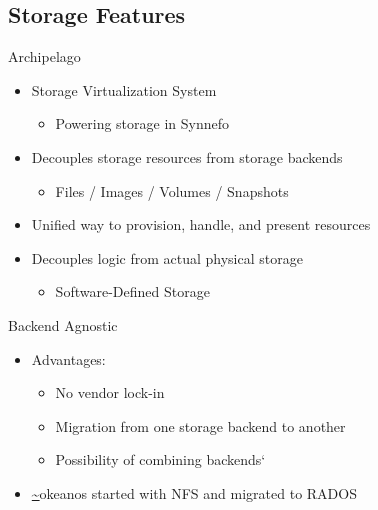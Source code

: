 \documentclass[utf8]{beamer}
\newcommand{\okeanos}{\url{~}okeanos}
\begin{document}
\subsection{Storage Features}

\begin{frame}{Archipelago}

  \begin{itemize}
    \item Storage Virtualization System
      \begin{itemize}
        \item Powering storage in Synnefo
      \end{itemize}
    \item Decouples storage resources from storage backends
      \begin{itemize}
        \item Files / Images / Volumes / Snapshots
      \end{itemize}
    \item Unified way to provision, handle, and present resources
    \item Decouples logic from actual physical storage
      \begin{itemize}
        \item Software-Defined Storage
      \end{itemize}
  \end{itemize}
    
\end{frame}

\begin{frame}{Backend Agnostic}

  \begin{itemize}
    \item Advantages:
      \begin{itemize}
      \item No vendor lock-in
      \item Migration from one storage backend to another
      \item Possibility of combining backends`
    \end{itemize}
    \item \okeanos{} started with NFS and migrated to RADOS
  \end{itemize}

\end{frame}
\end{document}
